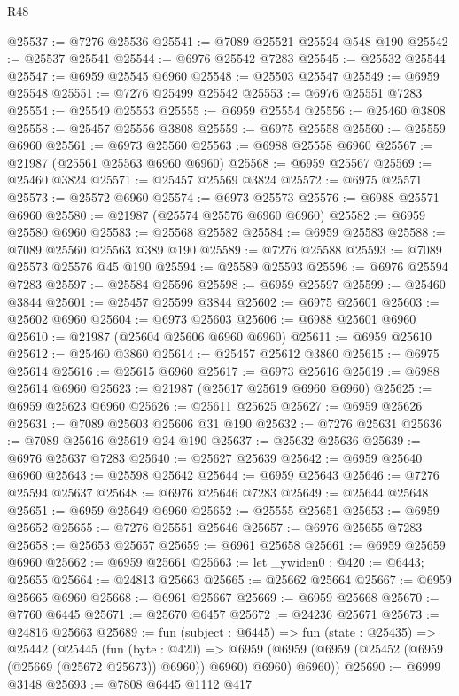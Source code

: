 \begin{lexlean}{R48}
\begin{coremodule}
@25537 := @7276 @25536
@25541 := @7089 @25521 @25524 @548 @190
@25542 := @25537 @25541
@25544 := @6976 @25542 @7283
@25545 := @25532 @25544
@25547 := @6959 @25545 @6960
@25548 := @25503 @25547
@25549 := @6959 @25548
@25551 := @7276 @25499 @25542
@25553 := @6976 @25551 @7283
@25554 := @25549 @25553
@25555 := @6959 @25554
@25556 := @25460 @3808
@25558 := @25457 @25556 @3808
@25559 := @6975 @25558
@25560 := @25559 @6960
@25561 := @6973 @25560
@25563 := @6988 @25558 @6960
@25567 := @21987 (@25561 @25563 @6960 @6960)
@25568 := @6959 @25567
@25569 := @25460 @3824
@25571 := @25457 @25569 @3824
@25572 := @6975 @25571
@25573 := @25572 @6960
@25574 := @6973 @25573
@25576 := @6988 @25571 @6960
@25580 := @21987 (@25574 @25576 @6960 @6960)
@25582 := @6959 @25580 @6960
@25583 := @25568 @25582
@25584 := @6959 @25583
@25588 := @7089 @25560 @25563 @389 @190
@25589 := @7276 @25588
@25593 := @7089 @25573 @25576 @45 @190
@25594 := @25589 @25593
@25596 := @6976 @25594 @7283
@25597 := @25584 @25596
@25598 := @6959 @25597
@25599 := @25460 @3844
@25601 := @25457 @25599 @3844
@25602 := @6975 @25601
@25603 := @25602 @6960
@25604 := @6973 @25603
@25606 := @6988 @25601 @6960
@25610 := @21987 (@25604 @25606 @6960 @6960)
@25611 := @6959 @25610
@25612 := @25460 @3860
@25614 := @25457 @25612 @3860
@25615 := @6975 @25614
@25616 := @25615 @6960
@25617 := @6973 @25616
@25619 := @6988 @25614 @6960
@25623 := @21987 (@25617 @25619 @6960 @6960)
@25625 := @6959 @25623 @6960
@25626 := @25611 @25625
@25627 := @6959 @25626
@25631 := @7089 @25603 @25606 @31 @190
@25632 := @7276 @25631
@25636 := @7089 @25616 @25619 @24 @190
@25637 := @25632 @25636
@25639 := @6976 @25637 @7283
@25640 := @25627 @25639
@25642 := @6959 @25640 @6960
@25643 := @25598 @25642
@25644 := @6959 @25643
@25646 := @7276 @25594 @25637
@25648 := @6976 @25646 @7283
@25649 := @25644 @25648
@25651 := @6959 @25649 @6960
@25652 := @25555 @25651
@25653 := @6959 @25652
@25655 := @7276 @25551 @25646
@25657 := @6976 @25655 @7283
@25658 := @25653 @25657
@25659 := @6961 @25658
@25661 := @6959 @25659 @6960
@25662 := @6959 @25661
@25663 := let _ywiden0 : @420 := @6443; @25655
@25664 := @24813 @25663
@25665 := @25662 @25664
@25667 := @6959 @25665 @6960
@25668 := @6961 @25667
@25669 := @6959 @25668
@25670 := @7760 @6445
@25671 := @25670 @6457
@25672 := @24236 @25671
@25673 := @24816 @25663
@25689 := fun (subject : @6445) =>
  fun (state : @25435) =>
  @25442
    (@25445
      (fun (byte : @420) =>
      @6959 (@6959 (@6959 (@25452 (@6959 (@25669 (@25672 @25673)) @6960)) @6960) @6960) @6960))
@25690 := @6999 @3148
@25693 := @7808 @6445 @1112 @417

\end{coremodule}
\end{lexlean}
